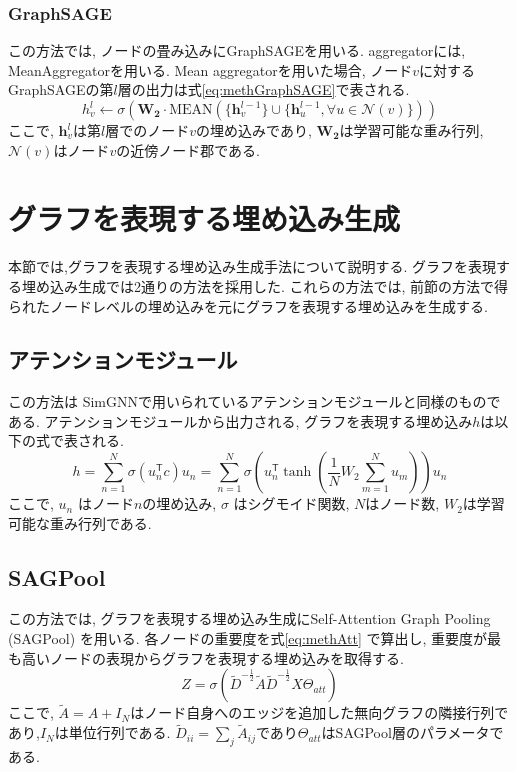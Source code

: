 \documentclass[a4j,twoside,12pt, dvipdfmx]{thesis} %
\begin{document}
\subsubsection{GraphSAGE}
この方法では, ノードの畳み込みにGraphSAGE\cite{hamilton2017inductive}を用いる.
aggregatorには, MeanAggregatorを用いる.
Mean aggregatorを用いた場合, ノード$v$に対するGraphSAGEの第$l$層の出力は式\ref{eq:methGraphSAGE}で表される.
\begin{equation}
  \label{eq:methGraphSAGE}
  h_{v}^{l} \leftarrow \sigma(\mathbf{W_{2}} \cdot \mathrm{MEAN} (\{ \mathbf{h}_{v}^{l-1}\} \cup \{ \mathbf{h}_{u}^{l-1} , \forall u \in \mathcal{N}(v) \}))
\end{equation}
ここで, $\mathbf{h}_{v}^{l}$は第$l$層でのノード$v$の埋め込みであり, $\mathbf{W_{2}}$は学習可能な重み行列, $\mathcal{N}(v)$はノード$v$の近傍ノード郡である.

\section{グラフを表現する埋め込み生成}\label{meth:createEmbedding}
本節では,グラフを表現する埋め込み生成手法について説明する.
グラフを表現する埋め込み生成では2通りの方法を採用した.
これらの方法では, 前節の方法で得られたノードレベルの埋め込みを元にグラフを表現する埋め込みを生成する.

\subsection{アテンションモジュール}
この方法は SimGNN\cite{bai2019simgnn}で用いられているアテンションモジュールと同様のものである.
アテンションモジュールから出力される, グラフを表現する埋め込み$h$は以下の式で表される.
\begin{equation}
  h = \sum_{n=1}^{N}\sigma(u_{n}^\mathsf{T}c)u_{n}= \sum_{n=1}^{N}\sigma(u_{n}^\mathsf{T} \tanh (\frac{1}{N}W_{2}\sum_{m=1}^{N}u_{m}))u_{n}
\end{equation}
ここで, $u_{n}$ はノード$n$の埋め込み, $\sigma$ はシグモイド関数, $N$はノード数, $W_{2}$は学習可能な重み行列である.

\subsection{SAGPool}
この方法では, グラフを表現する埋め込み生成にSelf-Attention Graph Pooling (SAGPool) \cite{lee2019self} を用いる.
各ノードの重要度を式\ref{eq:methAtt} で算出し, 重要度が最も高いノードの表現からグラフを表現する埋め込みを取得する.
\begin{equation}
  \label{eq:methAtt}
  Z = \sigma (\tilde{D}^{-\frac{1}{2}}\tilde{A}\tilde{D}^{-\frac{1}{2}}X\Theta_{att})
\end{equation}
ここで, $\tilde{A} = A + I_{N}$はノード自身へのエッジを追加した無向グラフの隣接行列であり,$I_N$は単位行列である.
$\tilde{D}_{ii} = \sum_{j} \tilde{A}_{ij}$であり$\Theta_{att}$はSAGPool層のパラメータである.
\end{document}
